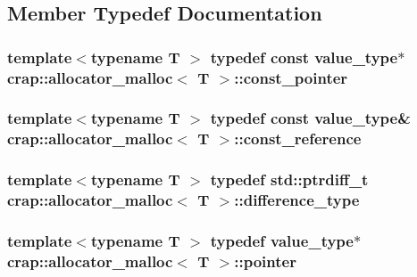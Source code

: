 \subsection{Member Typedef Documentation}
\hypertarget{classcrap_1_1allocator__malloc_acdfb7a73142fadd4d2da1260a41e0c8b}{
\subsubsection[{const\-\_\-pointer}]{\setlength{\rightskip}{0pt plus 5cm}template$<$typename T $>$ typedef const {\bf value\-\_\-type}$\ast$ {\bf crap\-::allocator\-\_\-malloc}$<$ T $>$\-::{\bf const\-\_\-pointer}}}\label{classcrap_1_1allocator__malloc_acdfb7a73142fadd4d2da1260a41e0c8b}
\hypertarget{classcrap_1_1allocator__malloc_ab8c48878eb30f1a5ffc7e7f55177731e}{
\subsubsection[{const\-\_\-reference}]{\setlength{\rightskip}{0pt plus 5cm}template$<$typename T $>$ typedef const {\bf value\-\_\-type}\& {\bf crap\-::allocator\-\_\-malloc}$<$ T $>$\-::{\bf const\-\_\-reference}}}\label{classcrap_1_1allocator__malloc_ab8c48878eb30f1a5ffc7e7f55177731e}
\hypertarget{classcrap_1_1allocator__malloc_ae101aa693d7df298314afd6fc0784900}{
\subsubsection[{difference\-\_\-type}]{\setlength{\rightskip}{0pt plus 5cm}template$<$typename T $>$ typedef std\-::ptrdiff\-\_\-t {\bf crap\-::allocator\-\_\-malloc}$<$ T $>$\-::{\bf difference\-\_\-type}}}\label{classcrap_1_1allocator__malloc_ae101aa693d7df298314afd6fc0784900}
\hypertarget{classcrap_1_1allocator__malloc_a2bc7f3c9513f482c998d0241fff499a4}{
\subsubsection[{pointer}]{\setlength{\rightskip}{0pt plus 5cm}template$<$typename T $>$ typedef {\bf value\-\_\-type}$\ast$ {\bf crap\-::allocator\-\_\-malloc}$<$ T $>$\-::{\bf pointer}}}\label{classcrap_1_1allocator__malloc_a2bc7f3c9513f482c998d0241fff499a4}
